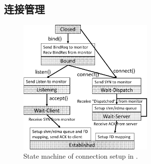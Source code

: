 \subsection{连接管理}
\label{socksdirect:subsec:connection-management}




\begin{figure}[t!]
	\centering
	\includegraphics[width=0.6\textwidth]{images/conn-setup-new}
	
	\caption{State machine of connection setup in \libipc{}.}
	\label{socksdirect:fig:conn-setup}
\end{figure}


